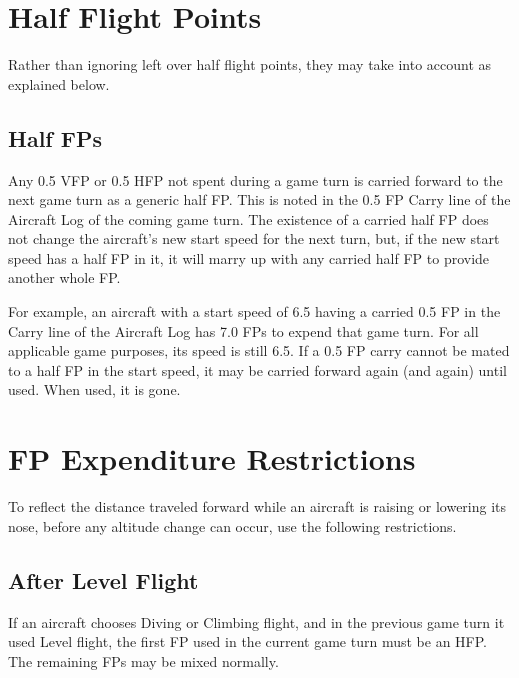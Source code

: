 \begin{advancedrules}

    \section{Half Flight Points}
    \label{rule:half-fps}


    Rather than ignoring left over half flight points, they may take into account as explained below.

    \subsection{Half FPs}
    Any 0.5 VFP or 0.5 HFP not spent during a game turn is carried forward to the next game turn as a generic half FP. This is noted in the 0.5 FP Carry line of the Aircraft Log of the coming game turn. The existence of a carried half FP does not change the aircraft's new start speed for the next turn, but, if the new start speed has a half FP in it, it will marry up with any carried half FP to provide another whole FP.

    For example, an aircraft with a start speed of 6.5 having a carried 0.5 FP in the Carry line of the Aircraft Log has 7.0 FPs to expend that game turn. For all applicable game purposes, its speed is still 6.5. If a 0.5 FP carry cannot be mated to a half FP in the start speed, it may be carried forward again (and again) until used. When used, it is gone.

    \section{FP Expenditure Restrictions}
    \label{rule:changing-flight-type}

    To reflect the distance traveled forward while an aircraft is raising or lowering its nose, before any altitude change can occur, use the following restrictions.

    \subsection{After Level Flight}
    If an aircraft chooses Diving or Climbing flight, and in the previous game turn it used Level flight, the first FP used in the current game turn must be an HFP. The remaining FPs may be mixed normally.


\end{advancedrules}
